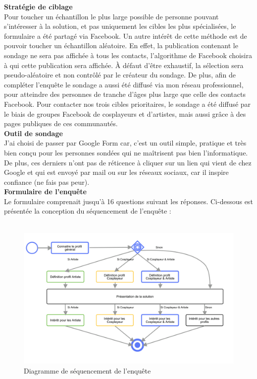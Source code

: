 \documentclass[a4paper,12pt]{article}
\begin{document}
\textbf{Stratégie de ciblage} \\
Pour toucher un échantillon le plus large possible de personne pouvant s’intéresser à la solution, et pas uniquement les cibles les plus spécialisées, le formulaire a été partagé via Facebook. Un autre intérêt de cette méthode est de pouvoir toucher un échantillon aléatoire. En effet, la publication contenant le sondage ne sera pas affichée à tous les contacts, l'algorithme de Facebook choisira à qui cette publication sera affichée. À défaut d’être exhaustif, la sélection sera pseudo-aléatoire et non contrôlé par le créateur du sondage. De plus, afin de compléter l'enquête le sondage a aussi été diffusé via mon réseau professionnel, pour atteindre des personnes de tranche d'âges plus large que celle des contacts Facebook.
Pour contacter nos trois cibles prioritaires, le sondage a été diffusé par le biais de groupes Facebook de cosplayeurs et d’artistes, mais aussi grâce à des pages publiques de ces communautés. \\

\textbf{Outil de sondage} \\
J'ai choisi de passer par Google Form car, c'est un outil simple, pratique et très bien conçu pour les personnes sondées qui ne maîtrisent pas bien l'informatique. De plus, ces derniers n'ont pas de réticence à cliquer sur un lien qui vient de chez Google et qui est envoyé par mail ou sur les réseaux sociaux, car il inspire confiance (ne fais pas peur). \\ 

\textbf{Formulaire de l'enquête}\\
Le formulaire comprenait jusqu'à 16 questions suivant les réponses. Ci-dessous est présentée la conception du séquencement de l'enquête : 
\\\\
\begin{figure}[!ht]
\centering
			\includegraphics[scale=0.25]{images/diagflow.png}
			\caption{Diagramme de séquencement de l'enquête}
\end{figure}
\end{document}
